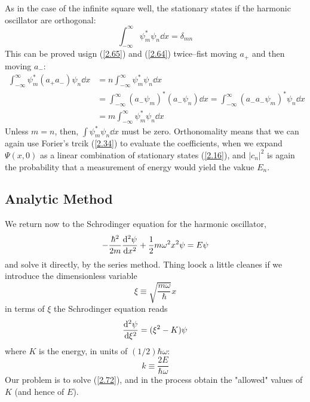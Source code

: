 As in the case of the infinite square well, the stationary states if the harmonic oscillator are orthogonal:
\begin{equation}\label{2.68}
	\int_{-\infty}^\infty \psi_m^*\psi_n\dd x=\delta_{mn}
\end{equation}
This can be proved usign (\ref{2.65}) and (\ref{2.64}) twice--fist moving $a_+$ and then moving $a_-$:
\begin{align*}
	\int_{-\infty}^\infty \psi_m^*(a_+a_-)\psi_n\dd x&=n\int_{-\infty}^\infty\psi_m^*\psi_n\dd x\\
																									 &=\int_{-\infty}^\infty(a_-\psi_m)^*(a_-\psi_n)\dd x=\int_{-\infty}^\infty(a_-a_-\psi_m)^*\psi_n\dd x\\
																									 &=m\int_{-\infty}^\infty\psi_m^*\psi_n\dd x
\end{align*}
Unless $m=n$, then, $\int\psi_m^*\psi_n\dd x$ must be zero. Orthonomality means that we can again use Forier's trcik (\ref{2.34}) to evaluate the coefficients, when we expand $\Psi(x,0)$ as a linear combination of stationary states (\ref{2.16}), and $|c_n|^2$ is again the probability that a measurement of energy would yield the vakue $E_n$.

\subsection{Analytic Method}
We return now to the Schrodinger equation for the harmonic oscillator,
\begin{equation}\label{2.70}
	-\frac{\hbar^2}{2m}\dv[2]{\psi}{x}+\frac{1}{2}m\omega^2x^2\psi=E\psi
\end{equation}
and solve it directly, by the series method. Thing loock a little cleanes if we introduce the dimensionless variable
\begin{equation}\label{2.71}
	\xi\equiv\sqrt{\frac{m\omega}{\hbar}}x
\end{equation}
in terms of $\xi$ the Schrodinger equation reads
\begin{equation}\label{2.72}
	\dv[2]{\psi}{\xi}=(\xi^2-K)\psi
\end{equation}
where $K$ is the energy, in units of $(1/2)\hbar\omega$:
\begin{equation}
	k\equiv\frac{2E}{\hbar\omega}
\end{equation}
Our problem is to solve (\ref{2.72}), and in the process obtain the "allowed" values of $K$ (and hence of $E$).

